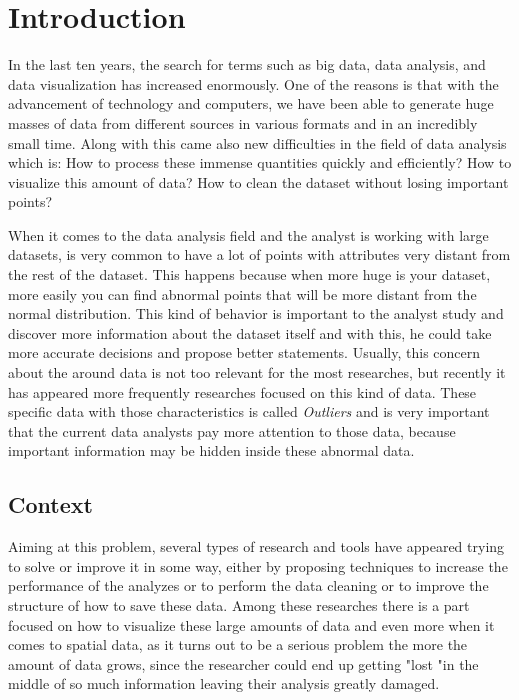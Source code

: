 \chapter{Introduction}


In the last ten years, the search for terms such as big data, data analysis, and
data visualization has increased enormously. One of the reasons is that with the
advancement of technology and computers, we have been able to generate huge masses
of data from different sources in various formats and in an incredibly small time.
Along with this came also new difficulties in the field of data analysis which is:
How to process these immense quantities quickly and efficiently? How to visualize
this amount of data? How to clean the dataset without losing important points?

When it comes to the data analysis field and the analyst is working with large
datasets, is very common to have a lot of points with attributes very distant from
the rest of the dataset. This happens because when more huge is your dataset, more
easily you can find abnormal points that will be more distant from the normal
distribution. This kind of behavior is important to the analyst study and discover
more information about the dataset itself and with this, he could take more accurate
decisions and propose better statements. Usually, this concern about the around data
is not too relevant for the most researches, but recently it has appeared more
frequently researches focused on this kind of data. These specific data with those
characteristics is called \textit{Outliers} and is very important that the current
data analysts pay more attention to those data, because important information may
be hidden inside these abnormal data.

\section{Context}


Aiming at this problem, several types of research and tools have appeared trying to
solve or improve it in some way, either by proposing techniques to increase
the performance of the analyzes or to perform the data cleaning or to improve the
structure of how to save these data. Among these researches there is a part focused
on how to visualize these large amounts of data and even more when it comes to
spatial data, as it turns out to be a serious problem the more the amount of data
grows, since the researcher could end up getting "lost "in the middle of so much
information leaving their analysis greatly damaged.

